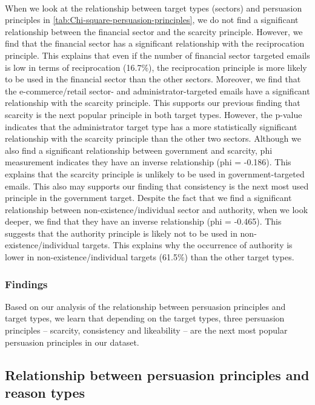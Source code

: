 \ \\
When we look at the relationship between target types (sectors) and
persuasion principles in \autoref{tab:Chi-square-persuasion-principles},
we do not find a significant relationship between the financial sector
and the scarcity principle. However, we find that the financial sector
has a significant relationship with the reciprocation principle. This
explains that even if the number of financial sector targeted emails
is low in terms of reciprocation (16.7\%), the reciprocation principle
is more likely to be used in the financial sector than the other sectors.
Moreover, we find that the e-commerce/retail sector- and administrator-targeted
emails have a significant relationship with the scarcity principle.
This supports our previous finding that scarcity is the next popular
principle in both target types. However, the p-value indicates that
the administrator target type has a more statistically significant
relationship with the scarcity principle than the other two sectors.
Although we also find a significant relationship between government
and scarcity, phi measurement indicates they have an inverse relationship
(phi = -0.186). This explains that the scarcity principle is unlikely
to be used in government-targeted emails. This also may supports our
finding that consistency is the next most used principle in the government
target. Despite the fact that we find a significant relationship between
non-existence/individual sector and authority, when we look deeper,
we find that they have an inverse relationship (phi = -0.465). This
suggests that the authority principle is likely not to be used in
non-existence/individual targets. This explains why the occurrence
of authority is lower in non-existence/individual targets (61.5\%)
than the other target types.


\subsubsection{\label{sub:Finding}Findings}

Based on our analysis of the relationship between persuasion principles
and target types, we learn that depending on the target types, three
persuasion principles -- scarcity, consistency and likeability --
are the next most popular persuasion principles in our dataset.


\subsection{\label{sub:Relationship-between-persuasion-1}Relationship between
persuasion principles and reason types}

